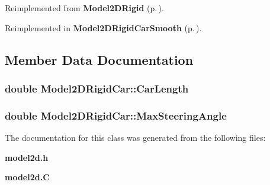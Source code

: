 Reimplemented from {\bf Model2DRigid} {\rm (p.\,\pageref{classModel2DRigid_a3})}.

Reimplemented in {\bf Model2DRigid\-Car\-Smooth} {\rm (p.\,\pageref{classModel2DRigidCarSmooth_a2})}.

\subsection{Member Data Documentation}
\subsubsection{\setlength{\rightskip}{0pt plus 5cm}double Model2DRigid\-Car::Car\-Length}\label{classModel2DRigidCar_m1}


\subsubsection{\setlength{\rightskip}{0pt plus 5cm}double Model2DRigid\-Car::Max\-Steering\-Angle}\label{classModel2DRigidCar_m0}




The documentation for this class was generated from the following files:\begin{CompactItemize}
\item 
{\bf model2d.h}\item 
{\bf model2d.C}\end{CompactItemize}
